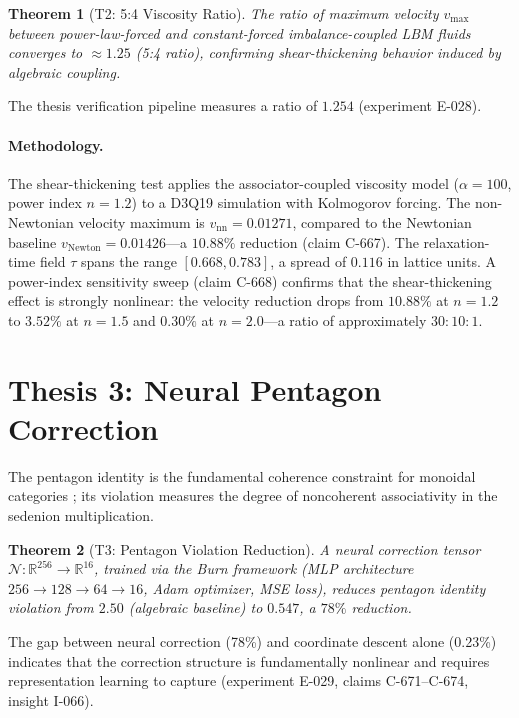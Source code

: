\documentclass[12pt,openany]{report}
\theoremstyle{definition}
\theoremstyle{plain}
\newtheorem{theorem}{Theorem}[chapter]
\theoremstyle{remark}
\begin{document}
\begin{theorem}[T2: 5:4 Viscosity Ratio]
The ratio of maximum velocity $v_{\max}$ between power-law-forced and
constant-forced imbalance-coupled LBM fluids converges to $\approx 1.25$
(5:4 ratio), confirming shear-thickening behavior induced by algebraic
coupling.
\end{theorem}

The thesis verification pipeline measures a ratio of $1.254$ (experiment E-028).

\paragraph{Methodology.}
The shear-thickening test applies the associator-coupled viscosity model
($\alpha = 100$, power index $n = 1.2$) to a D3Q19 simulation with
Kolmogorov forcing.  The non-Newtonian velocity maximum is
$v_{\mathrm{nn}} = 0.01271$, compared to the Newtonian baseline
$v_{\mathrm{Newton}} = 0.01426$---a $10.88\%$ reduction (claim C-667).
The relaxation-time field $\tau$ spans the range $[0.668, 0.783]$, a
spread of $0.116$ in lattice units.  A power-index sensitivity sweep
(claim C-668) confirms that the shear-thickening effect is strongly
nonlinear: the velocity reduction drops from $10.88\%$ at $n = 1.2$
to $3.52\%$ at $n = 1.5$ and $0.30\%$ at $n = 2.0$---a ratio of
approximately $30{:}10{:}1$.

\section{Thesis 3: Neural Pentagon Correction}
\label{sec:t3}

The pentagon identity is the fundamental coherence constraint for
monoidal categories \citep{Yanofsky1998Coherence}; its violation
measures the degree of noncoherent associativity in the sedenion
multiplication.

\begin{theorem}[T3: Pentagon Violation Reduction]
A neural correction tensor $\mathcal{N}: \mathbb{R}^{256} \to
\mathbb{R}^{16}$, trained via the Burn framework (MLP architecture
$256 \to 128 \to 64 \to 16$, Adam optimizer, MSE loss), reduces pentagon
identity violation from $2.50$ (algebraic baseline) to $0.547$, a $78\%$
reduction.
\end{theorem}

The gap between neural correction (78\%) and coordinate descent
alone (0.23\%) indicates that the correction structure is fundamentally
nonlinear and requires representation learning to capture (experiment E-029,
claims C-671--C-674, insight I-066).
\end{document}

